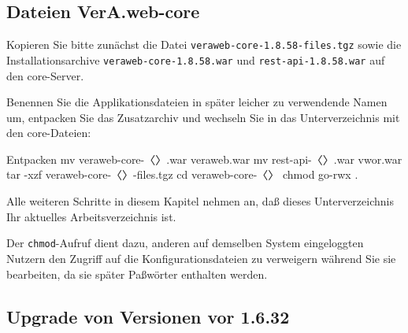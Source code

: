\documentclass{tarentanleitung}
\newcommand{\vwiaverssw}{1.8.58}
\newif\ifoa
\begin{document}
\subsection{Dateien VerA.web-core}\label{subsec:upgrade-core-files}

\ifoa
Kopieren Sie bitte zunächst die „\texttt{files}-Dateien“
\texttt{veraweb-core-\vwiaverssw{}-files.tgz} und\linebreak[1]
\texttt{online-anmeldung-\vwiaverssw{}-files.tgz}
\else%
Kopieren Sie bitte zunächst die Datei
\texttt{veraweb-core-\vwiaverssw{}-files.tgz}
\fi%
sowie die
Installationsarchive \texttt{veraweb-core-\vwiaverssw{}.war}
und \texttt{rest-api-\vwiaverssw{}.war} auf den core-Server.

\begin{minipage}{\linewidth}
Benennen Sie die Applikationsdateien in später leicher zu
verwendende Namen um, entpacken Sie das Zusatzarchiv und
wechseln Sie in das Unterverzeichnis mit den core-Dateien:

\ifoa
\begin{lstdump}{Entpacken}
mv veraweb-core-〈\lstdumpesc{\vwiaverssw}〉.war veraweb.war
mv rest-api-〈\lstdumpesc{\vwiaverssw}〉.war vwor.war
tar -xzf veraweb-core-〈\lstdumpesc{\vwiaverssw}〉-files.tgz
cd veraweb-core-〈\lstdumpesc{\vwiaverssw}〉
tar -xzf ../online-anmeldung-〈\lstdumpesc{\vwiaverssw}〉-files.tgz
mv online-anmeldung-〈\lstdumpesc{\vwiaverssw}〉/core/* .
chmod go-rwx .
\end{lstdump}
\else%
\begin{lstdump}{Entpacken}
mv veraweb-core-〈\lstdumpesc{\vwiaverssw}〉.war veraweb.war
mv rest-api-〈\lstdumpesc{\vwiaverssw}〉.war vwor.war
tar -xzf veraweb-core-〈\lstdumpesc{\vwiaverssw}〉-files.tgz
cd veraweb-core-〈\lstdumpesc{\vwiaverssw}〉
chmod go-rwx .
\end{lstdump}
\fi%
\end{minipage}

Alle weiteren Schritte in diesem Kapitel nehmen an, daß dieses
Unterverzeichnis Ihr aktuelles Arbeitsverzeichnis ist.

Der \texttt{chmod}-Aufruf dient dazu, anderen auf demselben System
eingeloggten Nutzern den Zugriff auf die Konfigurationsdateien zu
verweigern während Sie sie bearbeiten, da sie später Paßwörter
enthalten werden.

\subsection{Upgrade von Versionen vor 1.6.32}\label{subsec:upgrade-1632}
\end{document}
